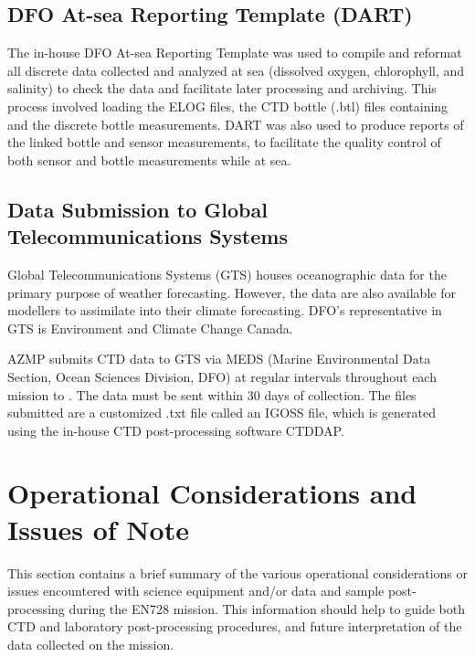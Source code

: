 \documentclass[12pt]{article}\usepackage[]{graphicx}\usepackage[]{color}
\begin{document}
\subsection{DFO At-sea Reporting Template (DART)}\label{dfo-at-sea-reporting-template-dart}

The in-house DFO At-sea Reporting Template  was used to compile and reformat all discrete data collected and analyzed at sea (dissolved oxygen, chlorophyll, and salinity) to check the data and facilitate later processing and archiving. This process involved loading the ELOG files, the CTD bottle (.btl) files containing and the discrete bottle measurements. DART was also used to produce reports of the linked bottle and sensor measurements, to facilitate the quality control of both sensor and bottle measurements while at sea.

\subsection{Data Submission to Global Telecommunications Systems}\label{data-submission-to-global-telecommunications-systems}

Global Telecommunications Systems (GTS) houses oceanographic data for the primary purpose of weather forecasting. However, the data are also available for modellers to assimilate into their climate forecasting. DFO's representative in GTS is Environment and Climate Change Canada.

AZMP submits CTD data to GTS via MEDS (Marine Environmental Data Section, Ocean Sciences Division, DFO) at regular intervals throughout each mission to . The data must be sent within 30 days of collection. The files submitted are a customized .txt file called an IGOSS file, which is generated using the in-house CTD post-processing software CTDDAP.

\clearpage

\section{Operational Considerations and Issues of Note}\label{operation-issues}

This section contains a brief summary of the various operational considerations or issues encountered with science equipment and/or data and sample post-processing during the EN728 mission. This information should help to guide both CTD and laboratory post-processing procedures, and future interpretation of the data collected on the mission.
\end{document}
